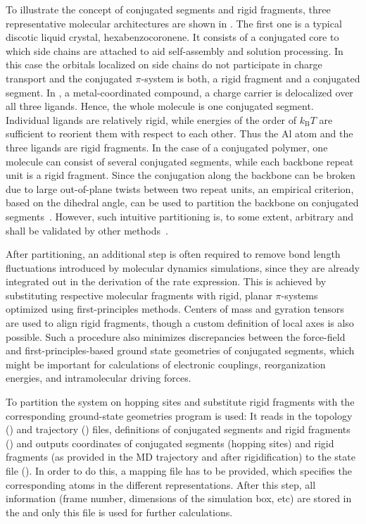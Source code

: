 To illustrate the concept of conjugated segments and rigid fragments, three representative molecular architectures are shown in . The first one is a typical discotic liquid crystal, hexabenzocoronene. It consists of a conjugated core to which side chains are attached to aid self-assembly and solution processing. In this case the orbitals localized on side chains do not participate in charge transport and the conjugated $\pi$-system is both, a rigid fragment and a conjugated segment. 
%
In \Alq, a metal-coordinated compound, a charge carrier is delocalized over all three ligands. Hence, the whole molecule is one conjugated segment. Individual ligands are relatively rigid, while energies of the order of $k_\text{B}T$ are sufficient to reorient them with respect to each other. Thus the Al atom and the three ligands are rigid fragments.
%
In the case of a conjugated polymer, one molecule can consist of several conjugated segments, while each backbone repeat unit is a rigid fragment. Since the conjugation along the backbone can be broken due to large out-of-plane twists between two repeat units, an empirical criterion, based on the dihedral angle, can be used to partition the backbone on conjugated segments~\cite{ruhle_multiscale_2010}. However, such intuitive partitioning is, to some extent, arbitrary and shall be validated by other methods~\cite{vukmirovic_charge_2008,vukmirovic_charge_2009,mcmahon_ad_2009}. 

After partitioning, an additional step is often required to remove bond length fluctuations introduced by molecular dynamics simulations, since they are already integrated out in the derivation of the rate expression. This is achieved by substituting respective molecular fragments with  rigid, planar $\pi$-systems optimized using first-principles methods. Centers of mass and gyration tensors are used to align rigid fragments, though a custom definition of local axes is also possible. Such a procedure also minimizes discrepancies between the force-field and first-principles-based ground state geometries of conjugated segments, which might be important for calculations of electronic couplings, reorganization energies, and intramolecular driving forces. 

To partition the system on hopping sites and substitute rigid fragments with the corresponding ground-state geometries \ctpmap program is used:
It reads in the \gromacs topology (\topology) and trajectory (\trajectory) files, definitions of conjugated segments and rigid fragments (\xmlcsg) and outputs coordinates of conjugated segments (hopping sites) and rigid fragments (as provided in the MD trajectory and after rigidification) to the  state file (\sqlstate). In order to do this, a mapping file \xmlcsg has to be provided, which specifies the corresponding atoms in the different representations. After this step, all information (frame number, dimensions of the simulation box, etc) are stored in the  and only this file is used for further calculations.

